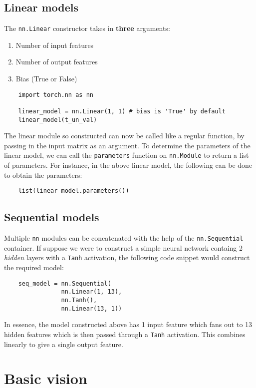 \documentclass[11pt]{article}
\begin{document}
\subsection{Linear models}
\label{sec:org7591158}
The \texttt{nn.Linear} constructor takes in \textbf{three} arguments:
\begin{enumerate}
\item Number of input features
\item Number of output features
\item Bias (True or False)
\end{enumerate}
\begin{verbatim}
    import torch.nn as nn

    linear_model = nn.Linear(1, 1) # bias is 'True' by default
    linear_model(t_un_val)
\end{verbatim}
The linear module so constructed can now be called like a regular function, by passing in the input matrix as an argument. To determine the parameters of the linear model, we can call the \texttt{parameters} function on \texttt{nn.Module} to return a list of parameters. For instance, in the above linear model, the following can be done to obtain the parameters:
\begin{verbatim}
    list(linear_model.parameters())
\end{verbatim}

\subsection{Sequential models}
\label{sec:orgcf75769}
Multiple \texttt{nn} modules can be concatenated with the help of the \texttt{nn.Sequential} container. If suppose we were to construct a simple neural network containg 2 \emph{hidden} layers with a \texttt{Tanh} activation, the following code snippet would construct the required model:
\begin{verbatim}
    seq_model = nn.Sequential(
                nn.Linear(1, 13),
                nn.Tanh(),
                nn.Linear(13, 1))
\end{verbatim}
In essence, the model constructed above has 1 input feature which fans out to 13 hidden features which is then passed through a \texttt{Tanh} activation. This combines linearly to give a single output feature.

\section{Basic vision}
\label{sec:org5dcb252}
\end{document}
